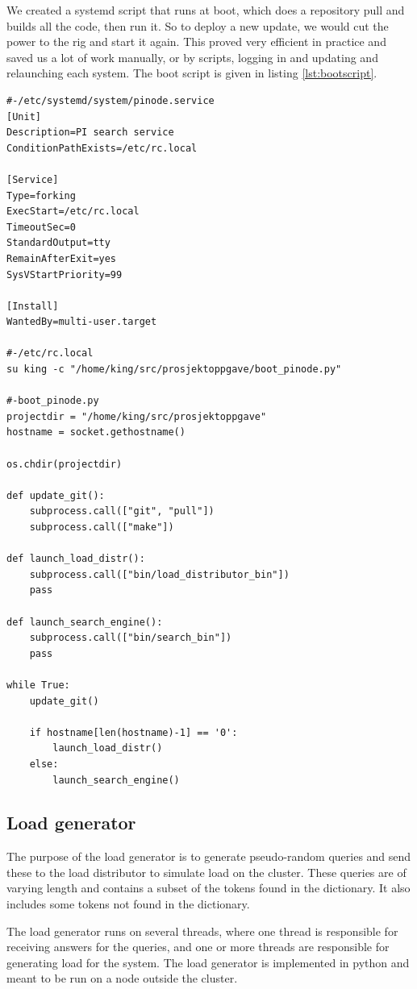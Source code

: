 We created a systemd script that runs at boot, which does a repository pull and builds all the code, then run it. So to deploy a new update, we would cut the power to the rig and start it again. 
This proved very efficient in practice and saved us a lot of work manually, or by scripts, logging in and updating and relaunching each system. The boot script is given in listing \ref{lst:bootscript}.
\begin{lstlisting}[captionpos=b,caption={Our Systemd boot script. It launches a script that makes sure datetime is set before launching the update script.},label={lst:bootscript}]
#-/etc/systemd/system/pinode.service
[Unit]
Description=PI search service
ConditionPathExists=/etc/rc.local

[Service]
Type=forking
ExecStart=/etc/rc.local
TimeoutSec=0
StandardOutput=tty
RemainAfterExit=yes
SysVStartPriority=99

[Install]
WantedBy=multi-user.target

#-/etc/rc.local
su king -c "/home/king/src/prosjektoppgave/boot_pinode.py" 

#-boot_pinode.py
projectdir = "/home/king/src/prosjektoppgave"
hostname = socket.gethostname()

os.chdir(projectdir)

def update_git():
    subprocess.call(["git", "pull"])
    subprocess.call(["make"])

def launch_load_distr():  
    subprocess.call(["bin/load_distributor_bin"])
    pass

def launch_search_engine():
    subprocess.call(["bin/search_bin"])
    pass

while True:
    update_git()

    if hostname[len(hostname)-1] == '0':
        launch_load_distr()
    else:
        launch_search_engine()

\end{lstlisting}

\subsection{Load generator}
The purpose of the load generator is to generate pseudo-random queries and send these to the load distributor to simulate load on the cluster. These queries are of varying length and contains a subset of the tokens found in the dictionary. It also includes some tokens not found in the dictionary.

The load generator runs on several threads, where one thread is responsible for receiving answers for the queries, and one or more threads are responsible for generating load for the system. The load generator is implemented in python and meant to be run on a node outside the cluster.


